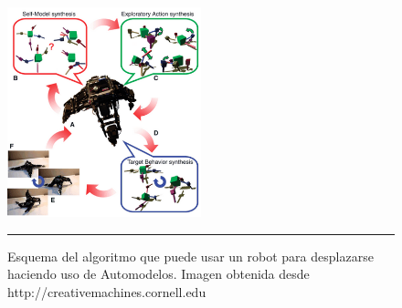 \begin{figure}[htbp]
	\centering
		\includegraphics[width=0.5\textwidth]{./Figures/algoritmo_automodelo.png}
		\rule{35em}{0.5pt}
	\caption[AutomodeladoLIPSON]{Esquema del algoritmo que puede usar un robot para desplazarse haciendo uso de Automodelos. Imagen obtenida desde http://creativemachines.cornell.edu}
	\label{fig:AutomodeladoLIPSON}
\end{figure}



